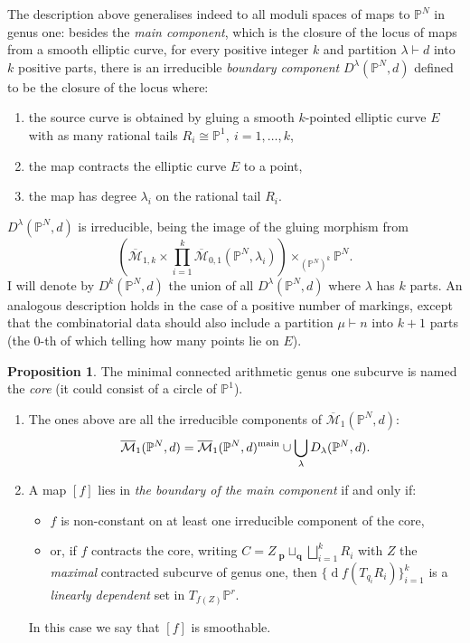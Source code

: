 \documentclass[11pt]{amsart}
\newcommand{\oM}{\overline{\mathcal{M}}}
\newcommand{\M}[4]{\overline{\mathcal{M}}_{#1,#2}(#3,#4)}
\newcommand{\PP}{\mathbb P}
\theoremstyle{definition}
\newtheorem{prop}[thm]{Proposition}
\theoremstyle{definition}
\begin{document}
The description above generalises indeed to all moduli spaces of maps to $\PP^N$ in genus one:
besides the \emph{main component}, which is the closure of the locus of maps from a smooth elliptic curve, for every positive integer $k$ and partition $\lambda\vdash d$ into $k$ positive parts, there is an irreducible \emph{boundary component} $D^{\lambda}(\PP^N,d)$ defined to be the closure of the locus where:
\begin{enumerate}[label=(\roman*)]
\item the source curve is obtained by gluing a smooth $k$-pointed elliptic curve $E$ with as many rational tails $R_i\cong\PP^1,\ i=1,\ldots,k$,
\item the map contracts the elliptic curve $E$ to a point, 
\item the map has degree $\lambda_i$ on the rational tail $R_i$.
\end{enumerate}
$D^{\lambda}(\PP^N,d)$ is irreducible, being the image of the gluing morphism from
\[\left(\oM_{1,k}\times\prod_{i=1}^k\M{0}{1}{\PP^N}{\lambda_i}\right)\times_{(\PP^N)^k}\PP^N.\]
I will denote by $D^k(\PP^N,d)$ the union of all $D^{\lambda}(\PP^N,d)$ where $\lambda$ has $k$ parts. An analogous description holds in the case of a positive number of markings, except that the combinatorial data should also include a partition $\mu\vdash n$ into $k+1$ parts (the $0$-th of which telling how many points lie on $E$).

\begin{prop}\label{prop:components} The minimal connected arithmetic genus one subcurve is named the \emph{core} (it could consist of a circle of $\PP^1$).
\begin{enumerate}
 \item The ones above are all the irreducible components of $\oM_1(\PP^N,d)$: 
\[\oM_1(\PP^N,d)=\oM_1(\PP^N,d)^{\rm{main}}\cup\bigcup_{\lambda}D_{\lambda}(\PP^N,d).\]
\item A map $[f]$ lies in \emph{the boundary of the main component}  if and only if:
\begin{itemize}[leftmargin=0cm]
\item $f$ is non-constant on at least one irreducible component of the core,
\item or, if $f$ contracts the core, writing $C=Z\ {}_{\mathbf p}\!\sqcup_{\mathbf q}\bigsqcup_{i=1}^k R_i$ with $Z$ the \emph{maximal} contracted subcurve of genus one, then $\{\operatorname{d}\!f(T_{q_i}R_i)\}_{i=1}^k$ is a \emph{linearly dependent} set in $T_{f(Z)}\PP^r$.
\end{itemize}
In this case we say that $[f]$ is smoothable.
\end{enumerate}
\end{prop}
 
\end{document}
